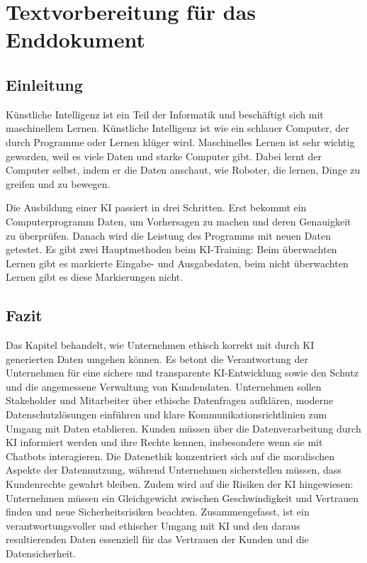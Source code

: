 \section{Textvorbereitung für das Enddokument}
\subsection{Einleitung}

Künstliche Intelligenz ist ein Teil der Informatik und beschäftigt sich mit maschinellem Lernen.
Künstliche Intelligenz ist wie ein schlauer Computer, der durch Programme oder Lernen klüger wird. Maschinelles Lernen ist sehr wichtig geworden, weil es viele Daten und starke Computer gibt. Dabei lernt der Computer selbst, indem er die Daten anschaut, wie Roboter, die lernen, Dinge zu greifen und zu bewegen.

Die Ausbildung einer KI passiert in drei Schritten. Erst bekommt ein Computerprogramm Daten, um Vorhersagen zu machen und deren Genauigkeit zu überprüfen. Danach wird die Leistung des Programms mit neuen Daten getestet. Es gibt zwei Hauptmethoden beim KI-Training: Beim überwachten Lernen gibt es markierte Eingabe- und Ausgabedaten, beim nicht überwachten Lernen gibt es diese Markierungen nicht.

\subsection{Fazit}

Das Kapitel behandelt, wie Unternehmen ethisch korrekt mit durch KI generierten Daten umgehen können. Es betont die Verantwortung der Unternehmen für eine sichere und transparente KI-Entwicklung sowie den Schutz und die angemessene Verwaltung von Kundendaten. 
\newline
\newline
Unternehmen sollen Stakeholder und Mitarbeiter über ethische Datenfragen aufklären, moderne Datenschutzlösungen einführen und klare Kommunikationsrichtlinien zum Umgang mit Daten etablieren. Kunden müssen über die Datenverarbeitung durch KI informiert werden und ihre Rechte kennen, insbesondere wenn sie mit Chatbots interagieren.
\newline
Die Datenethik konzentriert sich auf die moralischen Aspekte der Datennutzung, während Unternehmen sicherstellen müssen, dass Kundenrechte gewahrt bleiben. Zudem wird auf die Risiken der KI hingewiesen: Unternehmen müssen ein Gleichgewicht zwischen Geschwindigkeit und Vertrauen finden und neue Sicherheitsrisiken beachten.
\newline
\newline
Zusammengefasst, ist ein verantwortungsvoller und ethischer Umgang mit KI und den daraus resultierenden Daten essenziell für das Vertrauen der Kunden und die Datensicherheit.